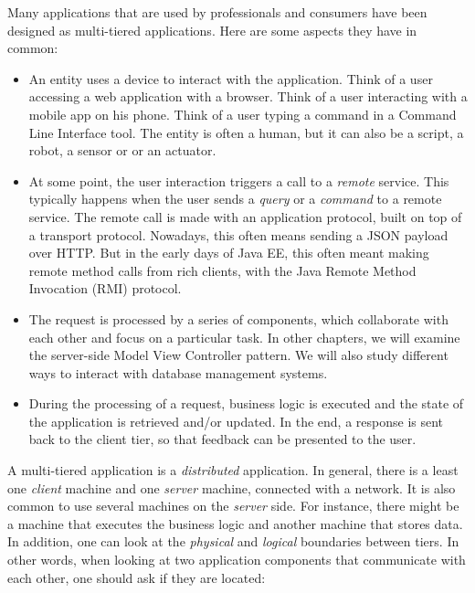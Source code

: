 
Many applications that are used by professionals and consumers have been designed as multi-tiered applications. Here are some aspects they have in common:

\begin{itemize}
\item An entity uses a device to interact with the application. Think of a user accessing a web application with a browser. Think of a user interacting with a mobile app on his phone. Think of a user typing a command in a Command Line Interface tool. The entity is often a human, but it can also be a script, a robot, a sensor or or an actuator.
\item At some point, the user interaction triggers a call to a \emph{remote} service. This typically happens when the user sends a \emph{query} or a \emph{command} to a remote service. The remote call is made with an application protocol, built on top of a transport protocol. Nowadays, this often means sending a JSON payload over HTTP. But in the early days of Java EE, this often meant making remote method calls from rich clients, with the Java Remote Method Invocation (RMI) protocol.
\item The request is processed by a series of components, which collaborate with each other and focus on a particular task. In other chapters, we will examine the server-side Model View Controller pattern. We will also study different ways to interact with database management systems.
\item During the processing of a request, business logic is executed and the state of the application is retrieved and/or updated. In the end, a response is sent back to the client tier, so that feedback can be presented to the user.
\end{itemize}

A multi-tiered application is a \emph{distributed} application. In general, there is a least one \emph{client} machine and one \emph{server} machine, connected with a network. It is also common to use several machines on the \emph{server} side. For instance, there might be a machine that executes the business logic and another machine that stores data. In addition, one can look at the \emph{physical} and \emph{logical} boundaries between tiers. In other words, when looking at two application components that communicate with each other, one should ask if they are located:

